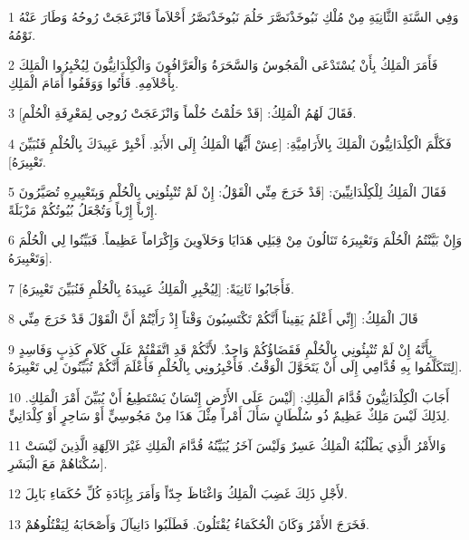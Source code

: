 \par 1 وَفِي السَّنَةِ الثَّانِيَةِ مِنْ مُلْكِ نَبُوخَذْنَصَّرَ حَلُمَ نَبُوخَذْنَصَّرُ أَحْلاَماً فَانْزَعَجَتْ رُوحُهُ وَطَارَ عَنْهُ نَوْمُهُ.
\par 2 فَأَمَرَ الْمَلِكُ بِأَنْ يُسْتَدْعَى الْمَجُوسُ وَالسَّحَرَةُ وَالْعَرَّافُونَ وَالْكِلْدَانِيُّونَ لِيُخْبِرُوا الْمَلِكَ بِأَحْلاَمِهِ. فَأَتُوا وَوَقَفُوا أَمَامَ الْمَلِكِ.
\par 3 فَقَالَ لَهُمُ الْمَلِكُ: [قَدْ حَلُمْتُ حُلْماً وَانْزَعَجَتْ رُوحِي لِمَعْرِفَةِ الْحُلْمِ].
\par 4 فَكَلَّمَ الْكِلْدَانِيُّونَ الْمَلِكَ بِالأَرَامِيَّةِ: [عِشْ أَيُّهَا الْمَلِكُ إِلَى الأَبَدِ. أَخْبِرْ عَبِيدَكَ بِالْحُلْمِ فَنُبَيِّنَ تَعْبِيرَهُ].
\par 5 فَقَالَ الْمَلِكُ لِلْكِلْدَانِيِّينَ: [قَدْ خَرَجَ مِنِّي الْقَوْلُ: إِنْ لَمْ تُنْبِئُونِي بِالْحُلْمِ وَبِتَعْبِيرِهِ تُصَيَّرُونَ إِرْباً إِرْباً وَتُجْعَلُ بُيُوتُكُمْ مَزْبَلَةً.
\par 6 وَإِنْ بَيَّنْتُمُ الْحُلْمَ وَتَعْبِيرَهُ تَنَالُونَ مِنْ قِبَلِي هَدَايَا وَحَلاَوِينَ وَإِكْرَاماً عَظِيماً. فَبَيِّنُوا لِي الْحُلْمَ وَتَعْبِيرَهُ].
\par 7 فَأَجَابُوا ثَانِيَةً: [لِيُخْبِرِ الْمَلِكُ عَبِيدَهُ بِالْحُلْمِ فَنُبَيِّنَ تَعْبِيرَهُ].
\par 8 قَالَ الْمَلِكُ: [إِنِّي أَعْلَمُ يَقِيناً أَنَّكُمْ تَكْتَسِبُونَ وَقْتاً إِذْ رَأَيْتُمْ أَنَّ الْقَوْلَ قَدْ خَرَجَ مِنِّي
\par 9 بِأَنَّهُ إِنْ لَمْ تُنْبِئُونِي بِالْحُلْمِ فَقَضَاؤُكُمْ وَاحِدٌ. لأَنَّكُمْ قَدِ اتَّفَقْتُمْ عَلَى كَلاَمٍ كَذِبٍ وَفَاسِدٍ لِتَتَكَلَّمُوا بِهِ قُدَّامِي إِلَى أَنْ يَتَحَوَّلَ الْوَقْتُ. فَأَخْبِرُونِي بِالْحُلْمِ فَأَعْلَمَ أَنَّكُمْ تُبَيِّنُونَ لِي تَعْبِيرَهُ].
\par 10 أَجَابَ الْكِلْدَانِيُّونَ قُدَّامَ الْمَلِكِ: [لَيْسَ عَلَى الأَرْضِ إِنْسَانٌ يَسْتَطِيعُ أَنْ يُبَيِّنَ أَمْرَ الْمَلِكِ. لِذَلِكَ لَيْسَ مَلِكٌ عَظِيمٌ ذُو سُلْطَانٍ سَأَلَ أَمْراً مِثْلَ هَذَا مِنْ مَجُوسِيٍّ أَوْ سَاحِرٍ أَوْ كِلْدَانِيٍّ.
\par 11 وَالأَمْرُ الَّذِي يَطْلُبُهُ الْمَلِكُ عَسِرٌ وَلَيْسَ آخَرُ يُبَيِّنُهُ قُدَّامَ الْمَلِكِ غَيْرَ الآلِهَةِ الَّذِينَ لَيْسَتْ سُكْنَاهُمْ مَعَ الْبَشَرِ].
\par 12 لأَجْلِ ذَلِكَ غَضِبَ الْمَلِكُ وَاغْتَاظَ جِدّاً وَأَمَرَ بِإِبَادَةِ كُلِّ حُكَمَاءِ بَابِلَ.
\par 13 فَخَرَجَ الأَمْرُ وَكَانَ الْحُكَمَاءُ يُقْتَلُونَ. فَطَلَبُوا دَانِيآلَ وَأَصْحَابَهُ لِيَقْتُلُوهُمْ.
